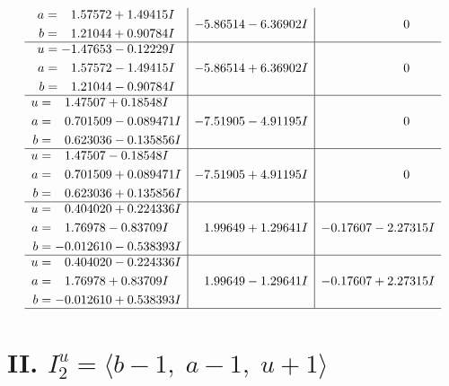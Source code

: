 \documentclass[1p]{elsarticle_modified}
\theoremstyle{definition}
\begin{document}
$$\begin{array}{c|c|c}
\begin{aligned}
a &= \phantom{-}1.57572 + 1.49415 I \\
b &= \phantom{-}1.21044 + 0.90784 I\end{aligned}
 & -5.86514 - 6.36902 I & \phantom{-0.000000 } 0 \\ \hline\begin{aligned}
u &= -1.47653 - 0.12229 I \\
a &= \phantom{-}1.57572 - 1.49415 I \\
b &= \phantom{-}1.21044 - 0.90784 I\end{aligned}
 & -5.86514 + 6.36902 I & \phantom{-0.000000 } 0 \\ \hline\begin{aligned}
u &= \phantom{-}1.47507 + 0.18548 I \\
a &= \phantom{-}0.701509 - 0.089471 I \\
b &= \phantom{-}0.623036 - 0.135856 I\end{aligned}
 & -7.51905 - 4.91195 I & \phantom{-0.000000 } 0 \\ \hline\begin{aligned}
u &= \phantom{-}1.47507 - 0.18548 I \\
a &= \phantom{-}0.701509 + 0.089471 I \\
b &= \phantom{-}0.623036 + 0.135856 I\end{aligned}
 & -7.51905 + 4.91195 I & \phantom{-0.000000 } 0 \\ \hline\begin{aligned}
u &= \phantom{-}0.404020 + 0.224336 I \\
a &= \phantom{-}1.76978 - 0.83709 I \\
b &= -0.012610 - 0.538393 I\end{aligned}
 & \phantom{-}1.99649 + 1.29641 I & -0.17607 - 2.27315 I \\ \hline\begin{aligned}
u &= \phantom{-}0.404020 - 0.224336 I \\
a &= \phantom{-}1.76978 + 0.83709 I \\
b &= -0.012610 + 0.538393 I\end{aligned}
 & \phantom{-}1.99649 - 1.29641 I & -0.17607 + 2.27315 I\\
 \hline 
 \end{array}$$\newpage\newpage\renewcommand{\arraystretch}{1}
\centering \section*{II. $I^u_{2}= \langle b-1,\;a-1,\;u+1 \rangle$}
\end{document}

